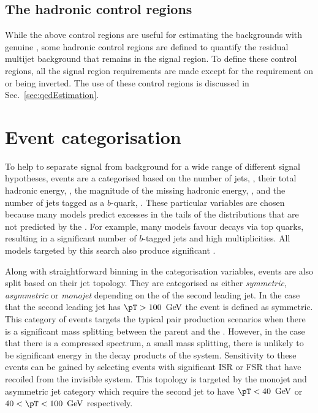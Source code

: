 \subsection{The hadronic control regions}

While the above control regions are useful for estimating the \SM
backgrounds with genuine \MET, some hadronic control regions are
defined to quantify the residual \QCD multijet background that remains
in the signal region. To define these control regions, all the signal
region requirements are made except for the requirement on \bdphi or
\mhtmet being inverted. The use of these control regions is
discussed in Sec.~\ref{sec:qcdEstimation}.

\section{Event categorisation}
\label{sec:categorisation}

To help to separate signal from background for a wide range of
different signal hypotheses, events are a categorised based on the
number of jets, \nj, their total hadronic energy, \HT, the magnitude
of the missing hadronic energy, \MHT, and the number of jets tagged as
a $b$-quark, \nb. These particular variables are chosen because many
\BSM models predict excesses in the tails of the distributions that
are not predicted by the \SM. For example, many \SUSY models favour
decays via top quarks, resulting in a significant number of $b$-tagged
jets and high \nj multiplicities. All \BSM models targeted by this
search also produce significant \MHT.

Along with straightforward binning in the categorisation variables,
events are also split based on their jet topology. They are
categorised as either \emph{symmetric}, \emph{asymmetric} or
\emph{monojet} depending on the \pT of the second leading
jet. In the case that the second leading jet has $\pT>100~\gev$ the
event is defined as symmetric. This category of events targets the
typical \SUSY pair production scenarios when there is a significant
mass splitting between the \SUSY parent and the \LSP. However, in the
case that there is a compressed spectrum, a small mass splitting,
there is unlikely to be significant energy in the \SM decay products
of the \SUSY system. Sensitivity to these events can be gained by
selecting events with significant \ac{ISR} or \ac{FSR} that have
recoiled from the invisible \SUSY system. This topology is targeted by
the monojet and asymmetric jet category which require the second jet
to have $\pT<40~\gev$ or $40<\pT<100~\gev$ respectively.

